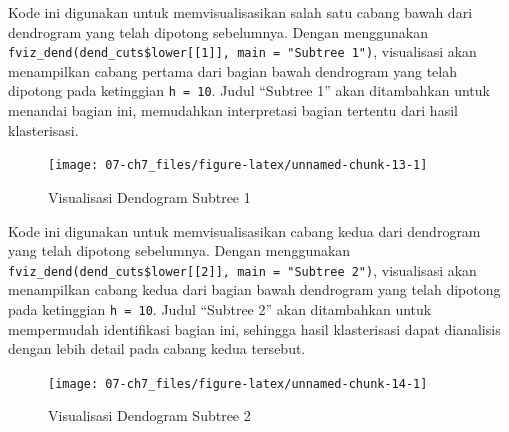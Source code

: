 \documentclass[
  oneside]{book}
\newenvironment{Shaded}{\begin{snugshade}}{\end{snugshade}}
\newcommand{\AttributeTok}[1]{\textcolor[rgb]{0.13,0.29,0.53}{#1}}
\newcommand{\CommentTok}[1]{\textcolor[rgb]{0.56,0.35,0.01}{\textit{#1}}}
\newcommand{\DecValTok}[1]{\textcolor[rgb]{0.00,0.00,0.81}{#1}}
\newcommand{\FunctionTok}[1]{\textcolor[rgb]{0.13,0.29,0.53}{\textbf{#1}}}
\newcommand{\NormalTok}[1]{#1}
\newcommand{\SpecialCharTok}[1]{\textcolor[rgb]{0.81,0.36,0.00}{\textbf{#1}}}
\newcommand{\StringTok}[1]{\textcolor[rgb]{0.31,0.60,0.02}{#1}}
\begin{document}
Kode ini digunakan untuk memvisualisasikan salah satu cabang bawah dari dendrogram yang telah dipotong sebelumnya. Dengan menggunakan \texttt{fviz\_dend(dend\_cuts\$lower{[}{[}1{]}{]},\ main\ =\ "Subtree\ 1")}, visualisasi akan menampilkan cabang pertama dari bagian bawah dendrogram yang telah dipotong pada ketinggian \texttt{h\ =\ 10}. Judul ``Subtree 1'' akan ditambahkan untuk menandai bagian ini, memudahkan interpretasi bagian tertentu dari hasil klasterisasi.

\begin{Shaded}
\end{Shaded}

\begin{figure}[h]

{\centering \texttt{[image: 07-ch7\_files/figure-latex/unnamed-chunk-13-1]} 

}

\caption{Visualisasi Dendogram Subtree 1}\label{fig:unnamed-chunk-13}
\end{figure}

Kode ini digunakan untuk memvisualisasikan cabang kedua dari dendrogram yang telah dipotong sebelumnya. Dengan menggunakan \texttt{fviz\_dend(dend\_cuts\$lower{[}{[}2{]}{]},\ main\ =\ "Subtree\ 2")}, visualisasi akan menampilkan cabang kedua dari bagian bawah dendrogram yang telah dipotong pada ketinggian \texttt{h\ =\ 10}. Judul ``Subtree 2'' akan ditambahkan untuk mempermudah identifikasi bagian ini, sehingga hasil klasterisasi dapat dianalisis dengan lebih detail pada cabang kedua tersebut.

\begin{Shaded}
\end{Shaded}

\begin{figure}[h]

{\centering \texttt{[image: 07-ch7\_files/figure-latex/unnamed-chunk-14-1]} 

}

\caption{Visualisasi Dendogram Subtree 2}\label{fig:unnamed-chunk-14}
\end{figure}
\end{document}
